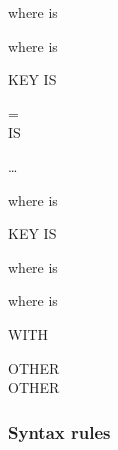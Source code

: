 where  is

\begin{syntax}
\end{syntax}

where  is

\begin{syntax}
   KEY IS \identifier
  \begin{0-1}
    \begin{1=}
      = \\
       IS
    \end{1=}
    \begin{1=}
      \identifier
    \end{1=}\ldots
  \end{0-1}
\end{syntax}

where  is

\begin{syntax}
   KEY IS \identifier
\end{syntax}

where  is

\begin{syntax}
\end{syntax}

where  is

\begin{syntax}
   WITH
  \begin{1=}
     OTHER \\
     OTHER \\
     
  \end{1=}
\end{syntax}

\subsubsection{Syntax rules}

